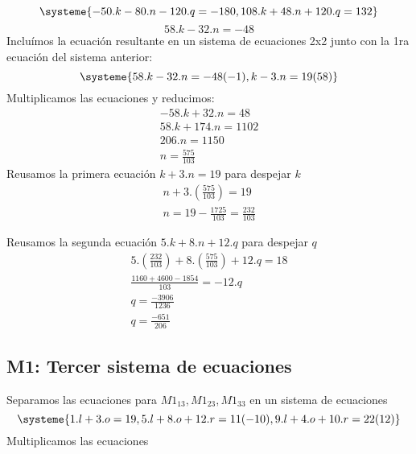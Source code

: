 \documentclass[11pt]{article}
\begin{document}
\begin{equation*}
\systeme{-50.k - 80.n - 120.q = -180,
108.k + 48.n + 120.q = 132
}
\end{equation*}
\begin{equation*}
58.k - 32.n = -48
\end{equation*}
Incluímos la ecuación resultante en un sistema de ecuaciones 2x2 junto con la 1ra ecuación del sistema anterior:
\begin{equation*}
\systeme{
58.k - 32.n = -48 (-1),
k - 3.n = 19 (58)
}
\end{equation*}
Multiplicamos las ecuaciones y reducimos:
\begin{align*}
-58.k + 32.n = 48\\
58.k + 174.n = 1102\\
206.n = 1150\\
n = \frac{575}{103}
\end{align*}
Reusamos la primera ecuación $k + 3.n = 19$ para despejar $k$
\begin{align*}
n + 3.(\frac{575}{103}) = 19 \\
n = 19 - \frac{1725}{103} = \frac{232}{103}
\end{align*}

Reusamos la segunda ecuación $5.k + 8.n + 12.q$ para despejar $q$
\begin{align*}
5.(\frac{232}{103}) + 8.(\frac{575}{103}) + 12.q = 18\\
\frac{1160 + 4600 - 1854}{103} = -12 . q\\
q = \frac{-3906}{1236}\\
q = \frac{-651}{206}
\end{align*}
\pagebreak
\subsection{M1: Tercer sistema de ecuaciones}

Separamos las ecuaciones para $M1_{13}, M1_{23}, M1_{33}$ en un sistema de ecuaciones
\begin{equation*}
\systeme{
1.l + 3.o = 19,
5.l + 8.o + 12.r = 11 (-10),
9.l + 4.o + 10.r = 22 (12)
}
\end{equation*}
Multiplicamos las ecuaciones
\end{document}
